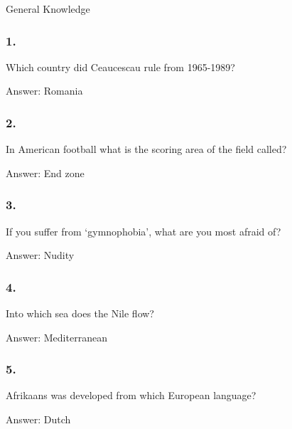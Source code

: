 \documentclass{beamer}
\begin{document}
    \begin{frame}
        \begin{center}
            \Huge General Knowledge
        \end{center}
    \end{frame}

    \begin{frame}
        \frametitle{1.}
        Which country did Ceaucescau rule from 1965-1989?\\

        \begin{center}
            Answer: Romania
        \end{center}
    \end{frame}

    \begin{frame}
        \frametitle{2.}
        In American football what is the scoring area of the field called?\\

        \begin{center}
            Answer: End zone
        \end{center}
    \end{frame}

    \begin{frame}
        \frametitle{3.}
        If you suffer from `gymnophobia', what are you most afraid of?\\

        \begin{center}
            Answer: Nudity
        \end{center}
    \end{frame}

    \begin{frame}
        \frametitle{4.}
        Into which sea does the Nile flow?\\

        \begin{center}
            Answer: Mediterranean
        \end{center}
    \end{frame}

    \begin{frame}
        \frametitle{5.}
        Afrikaans was developed from which European language?\\

        \begin{center}
            Answer: Dutch
        \end{center}
    \end{frame}
\end{document}
